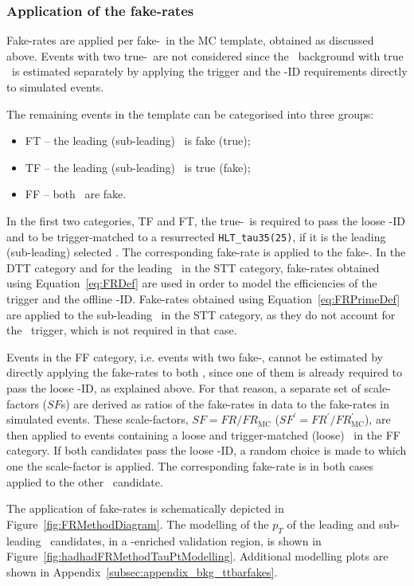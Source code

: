 \subsubsection{Application of the fake-rates}
Fake-rates are applied per fake-\tauhad\ in the MC template, obtained as discussed above. Events with two true-\tauhad\ are not considered since the \ttbar\ background with true \tauhad\ is estimated separately by applying the trigger and the \tauhad-ID requirements directly to simulated events.

The remaining events in the template can be categorised into three groups:
\begin{itemize}
\item FT -- the leading (sub-leading) \tauhad\ is fake (true);
\item TF -- the leading (sub-leading) \tauhad\ is true (fake);
\item FF -- both \tauhad\ are fake.
\end{itemize}
In the first two categories, TF and FT, the true-\tauhad\ is required to pass the loose \tauhad-ID and to be trigger-matched to a resurrected \verb|HLT_tau35(25)|, if it is the leading (sub-leading) selected \tauhad. The corresponding fake-rate is applied to the fake-\tauhad. In the DTT category and for the leading \tauhad\ in the STT category, fake-rates obtained using Equation~\eqref{eq:FRDef} are used in order to model the efficiencies of the trigger and the offline \tauhad-ID. Fake-rates obtained using Equation~\eqref{eq:FRPrimeDef} are applied to the sub-leading \tauhad\ in the STT category, as they do not account for the \tauhad\ trigger, which is not required in that case.

Events in the FF category, i.e. events with two fake-\tauhad, cannot be estimated by directly applying the fake-rates to both \tauhad, since one of them is already required to pass the loose \tauhad-ID, as explained above. For that reason, a separate set of scale-factors ($SF$s) are derived as ratios of the fake-rates in data to the fake-rates in simulated events. These scale-factors, $SF=FR/FR_{\mathrm{MC}}$ ($SF^{\prime} =FR^{\prime} /FR^{\prime}_{\mathrm{MC}}$), are then applied to events containing a loose and trigger-matched (loose) \tauhad\ in the FF category. If both candidates pass the loose \tauhad-ID, a random choice is made to which one the scale-factor is applied. The corresponding fake-rate is in both cases applied to the other \tauhad\ candidate. 

The application of fake-rates is schematically depicted in Figure~\ref{fig:FRMethodDiagram}. The modelling of the $p_T$ of the leading and sub-leading \tauhad\ candidates, in a \ttbar-enriched validation region, is shown in Figure~\ref{fig:hadhadFRMethodTauPtModelling}. Additional modelling plots are shown in Appendix~\ref{subsec:appendix_bkg_ttbarfakes}.

